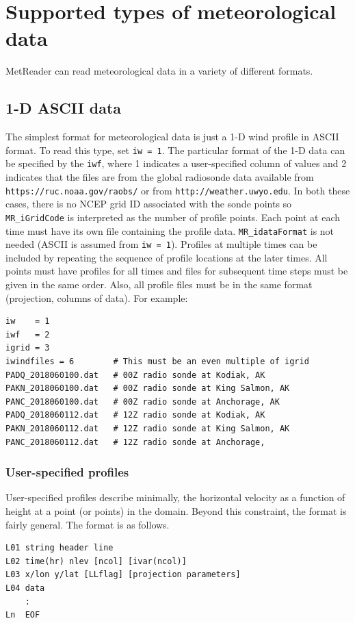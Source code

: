 \documentclass[11pt]{article}   %
\begin{document}
\section{Supported types of meteorological data}
MetReader can read meteorological data in a variety of different formats.  
\subsection{1-D ASCII data}
The simplest format for meteorological data is just a 1-D wind profile in ASCII
format.  To read this type, set \texttt{iw = 1}.  The particular format
of the 1-D data can be specified by the \texttt{iwf}, where 1 indicates a
user-specified column of values and 2 indicates that the files are from 
the global radiosonde data available from \texttt{https://ruc.noaa.gov/raobs/} or
from \texttt{http://weather.uwyo.edu}.
In both these cases, there is no NCEP grid ID associated with the sonde points so
\texttt{MR\_iGridCode} is interpreted as the number of profile points.  Each point at each
time must have its own file containing the profile data.
\texttt{MR\_idataFormat} is not needed (ASCII is assumed from \texttt{iw = 1}).
Profiles at multiple times can be included by repeating the sequence of profile
locations at the later times.  All points must have profiles for all times and files
for subsequent time steps must be given in the same order.
Also, all profile files must be in the same format (projection, columns of data).
For example:

\small
\begin{verbatim}
iw    = 1
iwf   = 2
igrid = 3
iwindfiles = 6        # This must be an even multiple of igrid
PADQ_2018060100.dat   # 00Z radio sonde at Kodiak, AK
PAKN_2018060100.dat   # 00Z radio sonde at King Salmon, AK
PANC_2018060100.dat   # 00Z radio sonde at Anchorage, AK
PADQ_2018060112.dat   # 12Z radio sonde at Kodiak, AK
PAKN_2018060112.dat   # 12Z radio sonde at King Salmon, AK
PANC_2018060112.dat   # 12Z radio sonde at Anchorage, 
\end{verbatim}
\normalsize

\subsubsection{User-specified profiles}
User-specified profiles describe minimally, the horizontal velocity as a function
of height at a point (or points) in the domain.  Beyond this constraint,
the format is fairly
general.  The format is as follows.
\small
\begin{verbatim}
L01 string header line
L02 time(hr) nlev [ncol] [ivar(ncol)]
L03 x/lon y/lat [LLflag] [projection parameters]
L04 data
    :
Ln  EOF
\end{verbatim}
\normalsize
\end{document}
